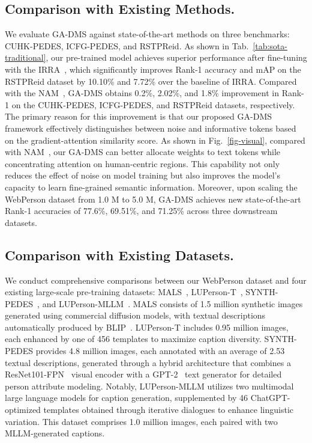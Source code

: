 \subsection{Comparison with Existing Methods.} 
We evaluate GA-DMS against state-of-the-art methods on three benchmarks: CUHK-PEDES, ICFG-PEDES, and RSTPReid. As shown in Tab.~\ref{tab:sota-traditional}, our pre-trained model achieves superior performance after fine-tuning with the IRRA~\cite{jiang2023cross}, which significantly improves Rank-1 accuracy and mAP on the RSTPReid dataset by 10.10\% and 7.72\% over the baseline of IRRA.  Compared with the NAM~\cite{tan2024harnessing}, GA-DMS obtains 0.2\%, 2.02\%, and 1.8\% improvement in Rank-1 on the CUHK-PEDES, ICFG-PEDES, and RSTPReid datasets, respectively. The primary reason for this improvement is that our proposed GA-DMS framework effectively distinguishes between noise and informative tokens based on the gradient-attention similarity score. As shown in Fig.~\ref{fig-visual}, compared with NAM~\cite{tan2024harnessing}, our GA-DMS can better allocate weights to text tokens while concentrating attention on human-centric regions. This capability not only reduces the effect of noise on model training but also improves the model’s capacity to learn fine-grained semantic information. Moreover, upon scaling the WebPerson dataset from 1.0 M to 5.0 M, GA-DMS achieves new state-of-the-art Rank-1 accuracies of 77.6\%, 69.51\%, and 71.25\% across three downstream datasets.




\subsection{Comparison with Existing Datasets.} We conduct comprehensive comparisons between our WebPerson dataset and four existing large-scale pre-training datasets: MALS~\cite{yang2023towards}, LUPerson-T~\cite{shao2023unified}, SYNTH-PEDES~\cite{zuo2024plip}, and LUPerson-MLLM~\cite{tan2024harnessing}. MALS consists of 1.5 million synthetic images generated using commercial diffusion models, with textual descriptions automatically produced by BLIP~\cite{li2022blip}. LUPerson-T includes 0.95 million images, each enhanced by one of 456 templates to maximize caption diversity. SYNTH-PEDES provides 4.8 million images, each annotated with an average of 2.53 textual descriptions, generated through a hybrid architecture that combines a ResNet101-FPN~\cite{he2016deep} visual encoder with a GPT-2~\cite{radford2019language} text generator for detailed person attribute modeling. Notably, LUPerson-MLLM utilizes two multimodal large language models for caption generation, supplemented by 46 ChatGPT-optimized templates obtained through iterative dialogues to enhance linguistic variation. This dataset comprises 1.0 million images, each paired with two MLLM-generated captions. 


